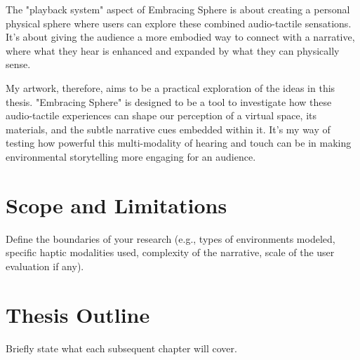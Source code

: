     The "playback system" aspect of Embracing Sphere is about creating a personal physical sphere where users can explore these combined audio-tactile sensations. It's about giving the audience a more embodied way to connect with a narrative, where what they hear is enhanced and expanded by what they can physically sense.\par
    
    My artwork, therefore, aims to be a practical exploration of the ideas in this thesis. "Embracing Sphere" is designed to be a tool to investigate how these audio-tactile experiences can shape our perception of a virtual space, its materials, and the subtle narrative cues embedded within it. It’s my way of testing how powerful this multi-modality of hearing and touch can be in making environmental storytelling more engaging for an audience.\par

    \section{Scope and Limitations} Define the boundaries of your research (e.g., types of environments modeled, specific haptic modalities used, complexity of the narrative, scale of the user evaluation if any).
    \section{Thesis Outline} Briefly state what each subsequent chapter will cover.